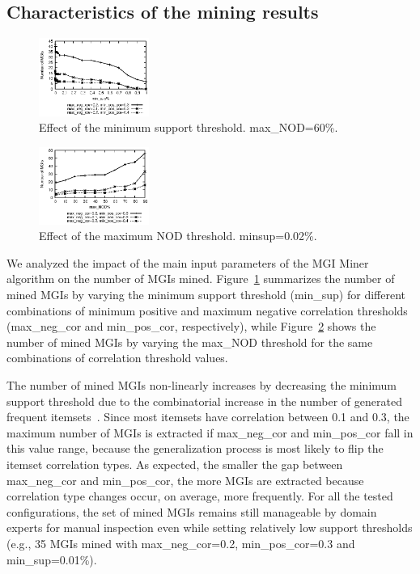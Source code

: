 \documentclass[10pt, conference, compsocconf]{IEEEtran}
\begin{document}
\subsection{Characteristics of the mining results}
\label{impactparam}

\begin{figure}[t]
\centering
\includegraphics[width=0.32\textwidth]{grafici/EffectMinsup.eps}
\caption{Effect of the minimum support threshold. max\_NOD=60\%.}
\label{fig:minsup}
\end{figure}

\begin{figure}[t]
\centering
\includegraphics[width=0.32\textwidth]{grafici/EffectMaxNOD.eps}
\caption{Effect of the maximum NOD threshold. minsup=0.02\%.}
\label{fig:maxnod}
\end{figure}

We analyzed the impact of the main input parameters of the MGI Miner algorithm on the number of MGIs mined.
Figure~\ref{fig:minsup} summarizes the number of mined MGIs by varying the minimum support threshold (min\_sup) for different combinations of minimum positive and maximum negative correlation thresholds (max\_neg\_cor and  min\_pos\_cor, respectively), 
while Figure~\ref{fig:maxnod} shows the number of mined MGIs by varying the max\_NOD threshold for the same combinations of correlation threshold values.

The number of mined MGIs non-linearly increases by decreasing the minimum support threshold due to the combinatorial increase in the number of generated frequent itemsets~\cite{Agr94}. 
Since most itemsets have correlation between 0.1 and 0.3, the maximum number of MGIs is extracted if max\_neg\_cor and min\_pos\_cor fall in this value range, 
because the generalization process is most likely to flip the itemset correlation types. As expected, the smaller the gap between max\_neg\_cor and min\_pos\_cor, 
the more MGIs are extracted because correlation type changes occur, on average, more frequently. 
For all the tested configurations, the set of mined MGIs remains still manageable by domain experts for manual inspection even while setting relatively low support thresholds (e.g., 35 MGIs mined with max\_neg\_cor=0.2, min\_pos\_cor=0.3 and min\_sup=0.01\%). 
\end{document}
